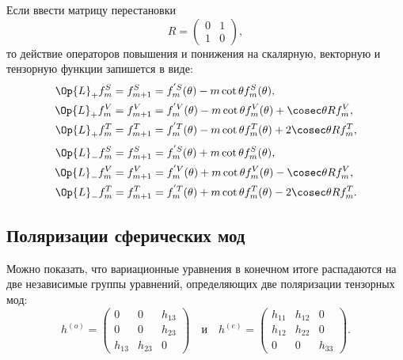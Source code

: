 \documentclass[\docroot/reports/draft/report.tex]{subfiles}
\begin{document}
    Если ввести матрицу перестановки
    \begin{equation}
        R = \begin{pmatrix}0&1\\1&0\end{pmatrix} ,
    \end{equation}
    то действие операторов повышения и понижения на скалярную, векторную и тензорную функции запишется в виде:
    \begin{equation}\begin{aligned}
        \Op{L}_{+} f^S_m &= f^S_{m+1} =
            f^{'S}_m(\theta) - m \cot\theta f^S_m(\theta), \\
        \Op{L}_{+} f^V_m &= f^V_{m+1} =
            f^{'V}_m(\theta) - m \cot\theta f^V_m(\theta) + \cosec\theta R f^V_m, \\
        \Op{L}_{+} f^T_m &= f^T_{m+1} =
            f^{'T}_m(\theta) - m \cot\theta f^T_m(\theta) + 2\cosec\theta R f^T_m,
    \end{aligned}\end{equation}
    \begin{equation}\begin{aligned}
        \Op{L}_{-} f^S_m &= f^S_{m+1} =
            f^{'S}_m(\theta) + m \cot\theta f^S_m(\theta), \\
        \Op{L}_{-} f^V_m &= f^V_{m+1} =
            f^{'V}_m(\theta) + m \cot\theta f^V_m(\theta) - \cosec\theta R f^V_m, \\
        \Op{L}_{-} f^T_m &= f^T_{m+1} =
            f^{'T}_m(\theta) + m \cot\theta f^T_m(\theta) - 2\cosec\theta R f^T_m.
    \end{aligned}\end{equation}

\subsection{Поляризации сферических мод}

    Можно показать, что вариационные уравнения в конечном итоге распадаются на две независимые группы уравнений, определяющих две поляризации тензорных мод:
    \begin{equation}
        h^{(o)} = \begin{pmatrix}0&0&h_{13}\\0&0&h_{23}\\h_{13}&h_{23}&0\end{pmatrix} \quad\text{и}\quad
        h^{(e)} = \begin{pmatrix}h_{11}&h_{12}&0\\h_{12}&h_{22}&0\\0&0&h_{33}\end{pmatrix} .
    \end{equation}
\end{document}
